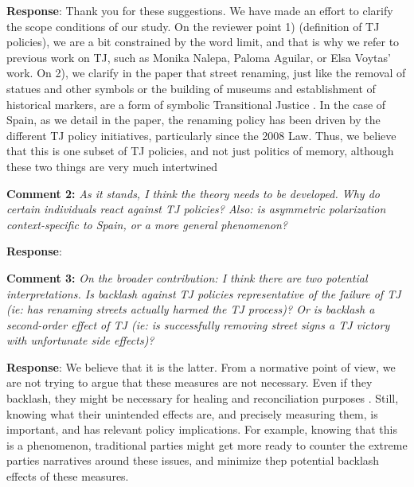 \documentclass[12pt, a4paper, notitlepage]{article}
\begin{document}
\textbf{Response}: {Thank you for these suggestions. We have made an effort to clarify the scope conditions of our study. On the reviewer point 1) (definition of TJ policies), we are a bit constrained by the word limit, and that is why we refer to previous work on TJ, such as Monika Nalepa, Paloma Aguilar, or Elsa Voytas' work. On 2), we clarify in the paper that street renaming, just like the removal of statues and other symbols or the building of museums and establishment of historical markers, are a form of symbolic Transitional Justice \citep{Ward2021}. In the case of Spain, as we detail in the paper, the renaming policy has been driven by the different TJ policy initiatives, particularly since the 2008 Law. Thus, we believe that this is one subset of TJ policies, and not just politics of memory, although these two things are very much intertwined}

\textbf{Comment 2:} \textit{As it stands, I think the theory needs to be developed. Why do certain individuals react against TJ policies? Also: is asymmetric polarization context-specific to Spain, or a more general phenomenon?}

\textbf{Response}: {}

\textbf{Comment 3:} \textit{On the broader contribution: I think there are two potential interpretations. Is backlash against TJ policies representative of the failure of TJ (ie: has renaming streets actually harmed the TJ process)? Or is backlash a second-order effect of TJ (ie: is successfully removing street signs a TJ victory with unfortunate side effects)?}

\textbf{Response}: {We believe that it is the latter.
From a normative point of view, we are not trying to argue that these measures are not necessary. Even if they backlash, they might be necessary for healing and reconciliation purposes \citep{Walsh2020, Ward2021}. Still, knowing what their unintended effects are, and precisely measuring them, is important, and has relevant policy implications. For example, knowing that this is a phenomenon, traditional parties might get more ready to counter the extreme parties narratives around these issues, and minimize thep potential backlash effects of these measures.
}
\end{document}
